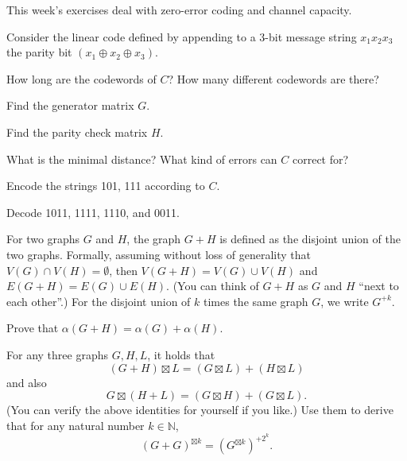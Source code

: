 \documentclass[a4paper,10pt,landscape,twocolumn]{scrartcl}
\begin{document}
\practiceproblems

{\sffamily\noindent
This week's exercises deal with zero-error coding and channel capacity. \practiceinstructions
}

\begin{exercise}
Consider the linear code defined by appending to a 3-bit message string $x_1x_2x_3$ the parity bit $(x_1 \oplus x_2 \oplus x_3)$.

\begin{subex}
How long are the codewords of $C$? How many different codewords are there?
\end{subex}

\begin{subex}
Find the generator matrix $G$.
\end{subex}

\begin{subex}
Find the parity check matrix $H$.
\end{subex}

\begin{subex}
What is the minimal distance? What kind of errors can $C$ correct for?
\end{subex}

\begin{subex}
Encode the strings 101, 111 according to $C$.
\end{subex}

\begin{subex}
Decode 1011, 1111, 1110, and 0011.
\end{subex}
\end{exercise}

\begin{exercise}
	For two graphs $G$ and $H$, the graph $G + H$ is defined as the disjoint union of the two graphs. Formally, assuming without loss of generality that $V(G) \cap V(H) = \emptyset$, then $V(G + H) = V(G) \cup V(H)$ and $E(G+H) = E(G) \cup E(H)$. (You can think of $G + H$ as $G$ and $H$ ``next to each other''.) For the disjoint union of $k$ times the same graph $G$, we write $G^{+k}$.
	\begin{subex}
		Prove that $\alpha(G+H) = \alpha(G) + \alpha(H)$.
	\end{subex}
	
	\begin{subex}
		For any three graphs $G,H,L$, it holds that
		\[
		(G+H) \boxtimes L = (G \boxtimes L) + (H \boxtimes L)
		\]
		and also
		\[
		G \boxtimes (H + L) = (G \boxtimes H) + (G \boxtimes L).
		\]
		(You can verify the above identities for yourself if you like.) Use them to derive that for any natural number $k \in \mathbb{N}$, \[(G + G)^{\boxtimes k} = (G^{\boxtimes k})^{+2^k}.\]
	\end{subex}
\end{exercise}
\end{document}
